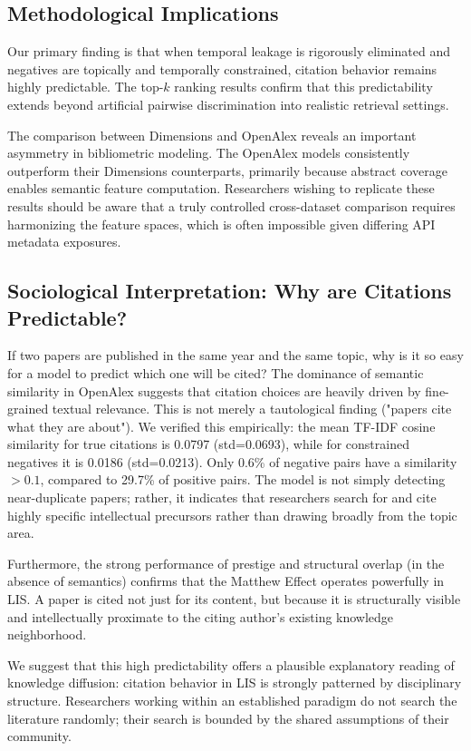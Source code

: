 \documentclass[11pt,a4paper]{article}
\begin{document}
\subsection{Methodological Implications}
Our primary finding is that when temporal leakage is rigorously eliminated and negatives are topically and temporally constrained, citation behavior remains highly predictable. The top-$k$ ranking results confirm that this predictability extends beyond artificial pairwise discrimination into realistic retrieval settings. 

The comparison between Dimensions and OpenAlex reveals an important asymmetry in bibliometric modeling. The OpenAlex models consistently outperform their Dimensions counterparts, primarily because abstract coverage enables semantic feature computation. Researchers wishing to replicate these results should be aware that a truly controlled cross-dataset comparison requires harmonizing the feature spaces, which is often impossible given differing API metadata exposures.

\subsection{Sociological Interpretation: Why are Citations Predictable?}
If two papers are published in the same year and the same topic, why is it so easy for a model to predict which one will be cited? The dominance of semantic similarity in OpenAlex suggests that citation choices are heavily driven by fine-grained textual relevance. This is not merely a tautological finding ("papers cite what they are about"). We verified this empirically: the mean TF-IDF cosine similarity for true citations is 0.0797 (std=0.0693), while for constrained negatives it is 0.0186 (std=0.0213). Only 0.6\% of negative pairs have a similarity $>0.1$, compared to 29.7\% of positive pairs. The model is not simply detecting near-duplicate papers; rather, it indicates that researchers search for and cite highly specific intellectual precursors rather than drawing broadly from the topic area.

Furthermore, the strong performance of prestige and structural overlap (in the absence of semantics) confirms that the Matthew Effect operates powerfully in LIS. A paper is cited not just for its content, but because it is structurally visible and intellectually proximate to the citing author's existing knowledge neighborhood. 

We suggest that this high predictability offers a plausible explanatory reading of knowledge diffusion: citation behavior in LIS is strongly patterned by disciplinary structure. Researchers working within an established paradigm do not search the literature randomly; their search is bounded by the shared assumptions of their community. 
\end{document}
